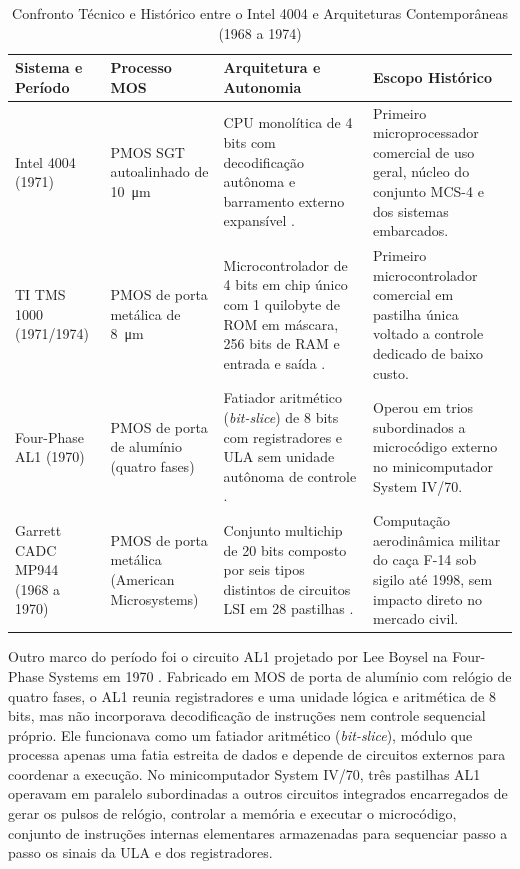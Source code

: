 \begin{table}[!t]
\renewcommand{\arraystretch}{1.2}
\caption{Confronto Técnico e Histórico entre o Intel 4004 e Arquiteturas Contemporâneas (1968 a 1974)}
\label{tab:confronto_contemporaneo}
\centering
\begin{tabularx}{\textwidth}{>{\raggedright\arraybackslash}p{3.4cm} >{\raggedright\arraybackslash}p{3.4cm} >{\raggedright\arraybackslash}p{5.2cm} >{\raggedright\arraybackslash}X}
\toprule
\textbf{Sistema e Período} & \textbf{Processo MOS} & \textbf{Arquitetura e Autonomia} & \textbf{Escopo Histórico} \\
\midrule
Intel 4004 (1971) & PMOS SGT autoalinhado de \SI{10}{\micro\meter} & CPU monolítica de 4 bits com decodificação autônoma e barramento externo expansível \cite{intel1973mcs4, faggin1974patent}. & Primeiro microprocessador comercial de uso geral, núcleo do conjunto MCS-4 e dos sistemas embarcados. \\
TI TMS 1000 (1971/1974) & PMOS de porta metálica de \SI{8}{\micro\meter} & Microcontrolador de 4 bits em chip único com 1 quilobyte de ROM em máscara, 256 bits de RAM e entrada e saída \cite{boone1973patent, boone1978patent}. & Primeiro microcontrolador comercial em pastilha única voltado a controle dedicado de baixo custo. \\
Four-Phase AL1 (1970) & PMOS de porta de alumínio (quatro fases) & Fatiador aritmético (\textit{bit-slice}) de 8 bits com registradores e ULA sem unidade autônoma de controle \cite{boysel1970}. & Operou em trios subordinados a microcódigo externo no minicomputador System IV/70. \\
Garrett CADC MP944 (1968 a 1970) & PMOS de porta metálica (American Microsystems) & Conjunto multichip de 20 bits composto por seis tipos distintos de circuitos LSI em 28 pastilhas \cite{holt1998cadc}. & Computação aerodinâmica militar do caça F-14 sob sigilo até 1998, sem impacto direto no mercado civil. \\
\bottomrule
\end{tabularx}
\end{table}

Outro marco do período foi o circuito AL1 projetado por Lee Boysel na Four-Phase Systems em 1970 \cite{boysel1970}. Fabricado em MOS de porta de alumínio com relógio de quatro fases, o AL1 reunia registradores e uma unidade lógica e aritmética de 8 bits, mas não incorporava decodificação de instruções nem controle sequencial próprio. Ele funcionava como um fatiador aritmético (\textit{bit-slice}), módulo que processa apenas uma fatia estreita de dados e depende de circuitos externos para coordenar a execução. No minicomputador System IV/70, três pastilhas AL1 operavam em paralelo subordinadas a outros circuitos integrados encarregados de gerar os pulsos de relógio, controlar a memória e executar o microcódigo, conjunto de instruções internas elementares armazenadas para sequenciar passo a passo os sinais da ULA e dos registradores.

